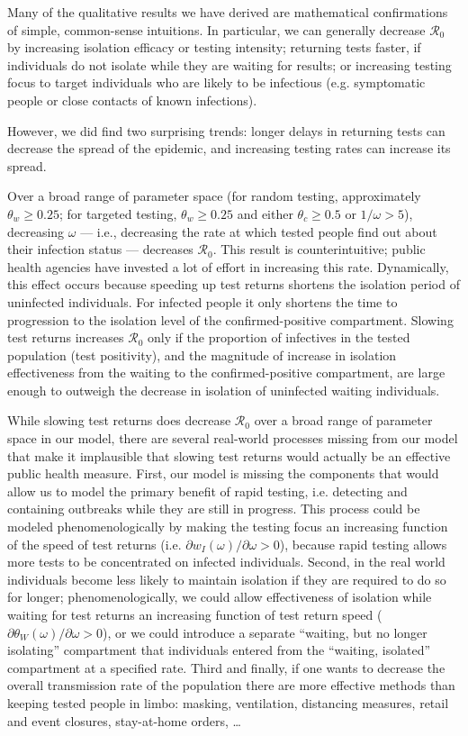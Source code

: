 \documentclass[12pt]{article}
\newcommand{\Rnum}{\ensuremath{\mathcal{R}_0}\xspace}
\DeclareRobustCommand\_{\ifmmode\expandafter\subtxt\else\textunderscore\fi}
\theoremstyle{definition} %
\begin{document}
Many of the qualitative results we have derived are mathematical confirmations of simple, common-sense intuitions. In particular, we can generally decrease $\Rnum$ by increasing isolation efficacy or testing intensity; returning tests faster, if individuals do not isolate while they are waiting for results; or increasing testing focus to target individuals who are likely to be infectious (e.g. symptomatic people or close contacts of known infections).

However, we did find two surprising trends: longer delays in returning tests can decrease the spread of the epidemic, and increasing testing rates can increase its spread.

Over a broad range of parameter space (for random testing, approximately $\theta_w \geq 0.25$; for targeted testing, $\theta_w \geq 0.25$ and either $\theta_c \ge 0.5$ or $1/\omega > 5$), decreasing $\omega$ --- i.e., decreasing the rate at which tested people find out about their infection status --- decreases $\Rnum$. This result is counterintuitive; public health agencies have invested a lot of effort in increasing this rate. Dynamically, this effect occurs because speeding up test returns shortens the isolation period of uninfected individuals. For infected people it only shortens the time to progression to the isolation level of the confirmed-positive compartment. Slowing test returns increases $\Rnum$ only if the proportion of infectives in the tested population (test positivity), and the magnitude of increase in isolation effectiveness from the waiting to the confirmed-positive compartment, are large enough to outweigh the decrease in isolation of uninfected waiting individuals.

While slowing test returns does decrease $\Rnum$ over a broad range of parameter space in our model, there are several real-world processes missing from our model that make it implausible that slowing test returns would actually be an effective public health measure. First, our model is missing the components that would allow us to model the primary benefit of rapid testing, i.e. detecting and containing outbreaks while they are still in progress. This process could be modeled phenomenologically by making the testing focus an increasing function of the speed of test returns (i.e. $\partial w_I(\omega)/\partial \omega > 0$), because rapid testing allows more tests to be concentrated on infected individuals. Second, in the real world individuals become less likely to maintain isolation if they are required to do so for longer; phenomenologically, we could allow  effectiveness of isolation while waiting for test returns an increasing function of test return speed ($\partial \theta_W(\omega)/\partial \omega > 0$), or we could introduce a separate ``waiting, but no longer isolating'' compartment that individuals entered from the ``waiting, isolated'' compartment at a specified rate. Third and finally, if one wants to decrease the overall transmission rate of the population there are more effective methods than keeping tested people in limbo: masking, ventilation, distancing measures, retail and event closures, stay-at-home orders, \ldots
\end{document}
